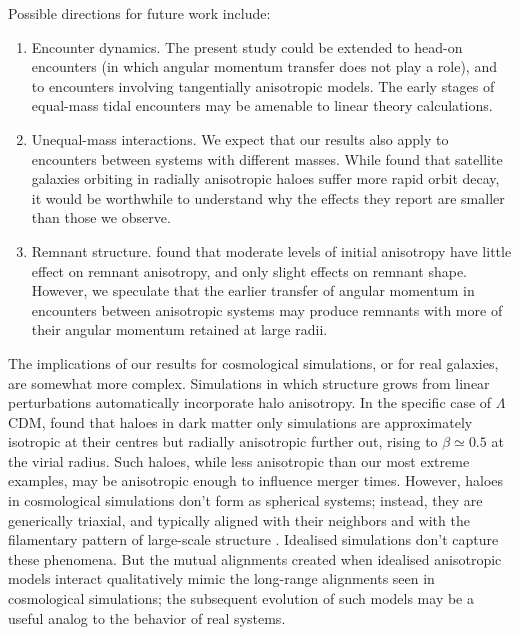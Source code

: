 \documentclass[fleqn,usenatbib]{mnras}
\begin{document}
Possible directions for future work include:
\begin{enumerate}

    \item Encounter dynamics. The present study could be extended to head-on encounters (in which angular momentum transfer does not play a role), and to encounters involving tangentially anisotropic models. The early stages of equal-mass tidal encounters may be amenable to linear theory calculations.
    
    \item Unequal-mass interactions. We expect that our results also apply to encounters between systems with different masses. While \citet{AB2007} found that satellite galaxies orbiting in radially aniso\-tropic haloes suffer more rapid orbit decay, it would be worthwhile to understand why the effects they report are smaller than those we observe.
    
    \item Remnant structure. \citet{McMillan2007} found that moderate levels of initial anisotropy have little effect on remnant anisotropy, and only slight effects on remnant shape. However, we speculate that the earlier transfer of angular momentum in encounters between anisotropic systems may produce remnants with more of their angular momentum retained at large radii.
    
\end{enumerate}

The implications of our results for cosmological simulations, or for real galaxies, are somewhat more complex. Simulations in which structure grows from linear perturbations automatically incorporate halo anisotropy. In the specific case of $\Lambda$CDM, \citet{Wojtak+2005} found that haloes in dark matter only simulations are approximately isotropic at their centres but radially anisotropic further out, rising to $\beta \simeq 0.5$ at the virial radius. Such haloes, while less anisotropic than our most extreme examples, may be anisotropic enough to influence merger times. However, haloes in cosmological simulations don't form as spherical systems; instead, they are generically triaxial, and typically aligned with their neighbors and with the filamentary pattern of large-scale structure \citep[e.g.,][]{BS2005,V+2018,D+2023}. Idealised simulations don't capture these phenomena. But the mutual alignments created when idealised anisotropic models interact qualitatively mimic the long-range alignments seen in cosmological simulations; the subsequent evolution of such models may be a useful analog to the behavior of real systems.
\end{document}
